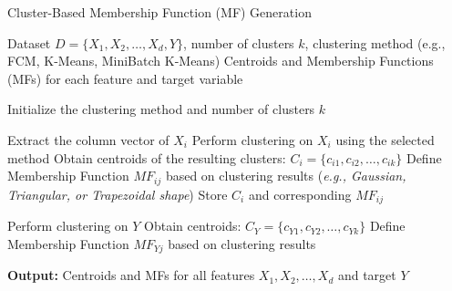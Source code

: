 \documentclass[12pt]{report}
\begin{document}
\begin{algorithm}[H]
\caption{Cluster-Based Membership Function (MF) Generation}
\label{alg:mf_generation}
\begin{algorithmic}[1]
\Require Dataset $D = \{ X_1, X_2, \ldots, X_d, Y \}$, number of clusters $k$, clustering method (e.g., FCM, K-Means, MiniBatch K-Means)
\Ensure Centroids and Membership Functions (MFs) for each feature and target variable

\State Initialize the clustering method and number of clusters $k$

    \State Extract the column vector of $X_i$
    \State Perform clustering on $X_i$ using the selected method
    \State Obtain centroids of the resulting clusters: $C_i = \{ c_{i1}, c_{i2}, \ldots, c_{ik} \}$
        \State Define Membership Function $MF_{ij}$ based on clustering results
        \State (\textit{e.g., Gaussian, Triangular, or Trapezoidal shape})
    \EndFor
    \State Store $C_i$ and corresponding $MF_{ij}$
\EndFor

\Statex

\State Perform clustering on $Y$
\State Obtain centroids: $C_Y = \{ c_{Y1}, c_{Y2}, \ldots, c_{Yk} \}$
    \State Define Membership Function $MF_{Yj}$ based on clustering results
\EndFor

\Statex

\State \textbf{Output:} Centroids and MFs for all features $X_1, X_2, \ldots, X_d$ and target $Y$
\end{algorithmic}
\end{algorithm}
\end{document}

